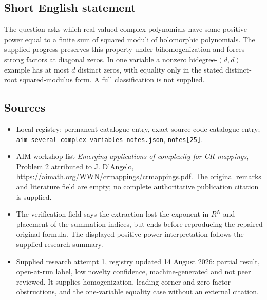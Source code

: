 \documentclass[11pt]{article}
\begin{document}
\subsection{Short English statement}
The question asks which real-valued complex polynomials have some positive power equal to a finite sum of squared moduli of holomorphic polynomials. The supplied progress preserves this property under bihomogenization and forces strong factors at diagonal zeros. In one variable a nonzero bidegree-$(d,d)$ example has at most $d$ distinct zeros, with equality only in the stated distinct-root squared-modulus form. A full classification is not supplied.
\subsection{Sources}
\begin{itemize}
\item Local registry: permanent catalogue entry, exact source code catalogue entry; \texttt{aim-several-complex-variables-notes.json}, \texttt{notes[25]}.
\item AIM workshop list \emph{Emerging applications of complexity for CR mappings}, Problem 2 attributed to J. D'Angelo, \url{https://aimath.org/WWN/crmappings/crmappings.pdf}. The original remarks and literature field are empty; no complete authoritative publication citation is supplied.
\item The verification field says the extraction lost the exponent in $R^N$ and placement of the summation indices, but ends before reproducing the repaired original formula. The displayed positive-power interpretation follows the supplied research summary.
\item Supplied research attempt 1, registry updated 14 August 2026: partial result, open-at-run label, low novelty confidence, machine-generated and not peer reviewed. It supplies homogenization, leading-corner and zero-factor obstructions, and the one-variable equality case without an external citation.
\end{itemize}
\end{document}
